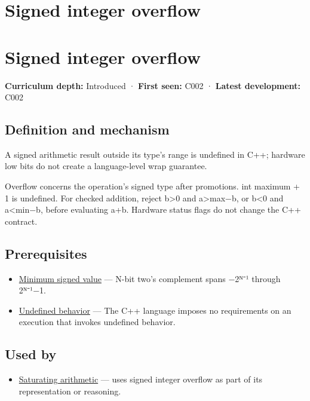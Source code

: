 \hypertarget{appendix-1a599c924a4e}{}
\section*{Signed integer overflow}
\section{Signed integer overflow}\label{appendix-1a599c924a4e-signed-integer-overflow}

\textbf{Curriculum depth:} Introduced · \textbf{First seen:} C002 · \textbf{Latest development:} C002

\subsection{Definition and mechanism}\label{appendix-1a599c924a4e-definition-and-mechanism}

A signed arithmetic result outside its type's range is undefined in C++; hardware low bits do not create a language-level wrap guarantee.

Overflow concerns the operation's signed type after promotions. int maximum + 1 is undefined. For checked addition, reject b\textgreater0 and a\textgreater max−b, or b\textless0 and a\textless min−b, before evaluating a+b. Hardware status flags do not change the C++ contract.

\subsection{Prerequisites}\label{appendix-1a599c924a4e-prerequisites}

\begin{itemize}
\tightlist
\item
  \hyperref[appendix-05f39b10364d]{Minimum signed value} --- N-bit two's complement spans −2ᴺ⁻¹ through 2ᴺ⁻¹−1.
\item
  \hyperref[appendix-f558f5b4d8f2]{Undefined behavior} --- The C++ language imposes no requirements on an execution that invokes undefined behavior.
\end{itemize}

\subsection{Used by}\label{appendix-1a599c924a4e-used-by}

\begin{itemize}
\tightlist
\item
  \hyperref[appendix-3999c6209649]{Saturating arithmetic} --- uses signed integer overflow as part of its representation or reasoning.
\end{itemize}

